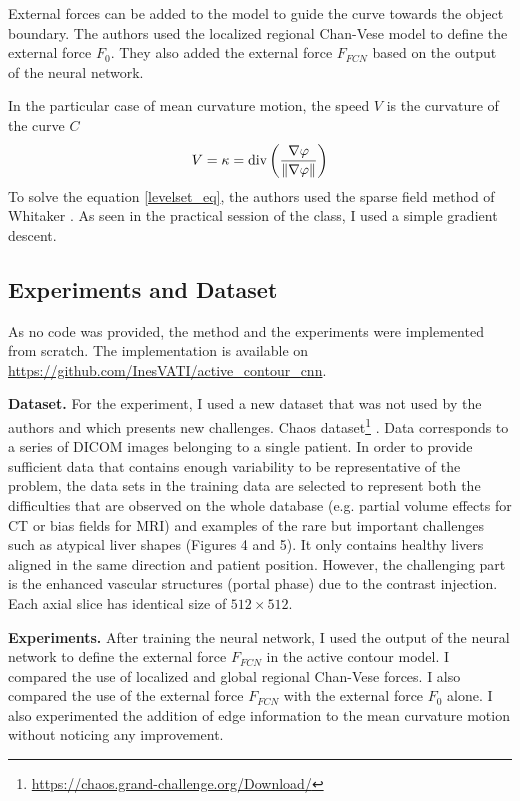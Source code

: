 \documentclass[a4paper, 11pt]{article}
\begin{document}
External forces can be added to the model to guide the curve towards the object boundary. The authors used the localized regional Chan-Vese model \cite{lankton_localizing_2008} to define the external force $F_0$. They also added the external force $F_{FCN}$ based on the output of the neural network. 

In the particular case of mean curvature motion, the speed $V$ is the curvature of the curve $C$
$$ V = \kappa = \textrm{div}\left(\frac{\nabla\varphi}{\left\lVert\nabla\varphi\right\rVert}\right) $$
To solve the equation \ref{levelset_eq}, the authors used the sparse field method of Whitaker \cite{whitaker_level-set_1998}. As seen in the practical session of the class, I used a simple gradient descent.


\subsection{Experiments and Dataset}
As no code was provided, the method and the experiments were implemented from scratch. The implementation is available on \url{https://github.com/InesVATI/active_contour_cnn}.

\textbf{Dataset.} For the experiment, I used a new dataset that was not used by the authors and which presents new challenges. Chaos dataset\footnote{\url{https://chaos.grand-challenge.org/Download/}} \cite{kavur_chaos_2019}. Data corresponds to a series of DICOM images belonging to a single patient. In order to provide sufficient data that contains enough variability to be representative of the problem, the data sets in the training data are selected to represent both the difficulties that are observed on the whole database (e.g. partial volume effects for CT or bias fields for MRI) and examples of the rare but important challenges such as atypical liver shapes (Figures 4 and 5). It only contains healthy livers aligned in the same direction and patient position. However, the challenging part is the enhanced vascular structures (portal phase) due to the contrast injection. Each axial slice has identical size of $512 \times 512$.

\textbf{Experiments.} After training the neural network, I used the output of the neural network to define the external force $F_{FCN}$ in the active contour model. I compared the use of localized and global regional Chan-Vese forces. I also compared the use of the external force $F_{FCN}$ with the external force $F_0$ alone. I also experimented the addition of edge information to the mean curvature motion without noticing any improvement.
\end{document}
